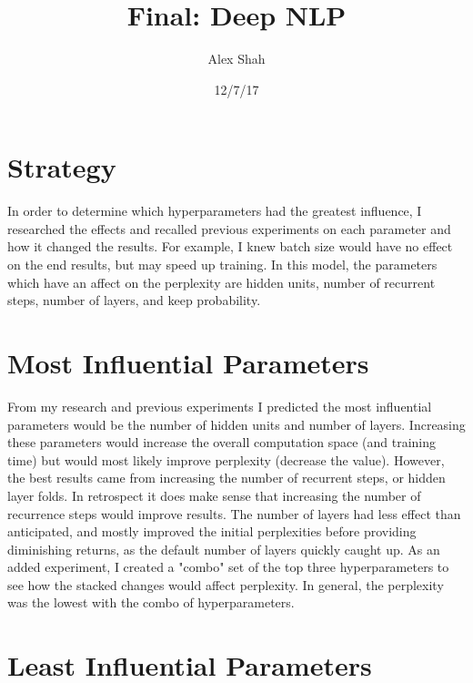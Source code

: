 \documentclass[10pt,a4paper]{article}
\begin{document}
\title{Final: Deep NLP}
\author{Alex Shah}
\date{12/7/17}

\maketitle

\section{Strategy}

In order to determine which hyperparameters had the greatest influence, I researched the effects and recalled previous experiments on each parameter and how it changed the results. For example, I knew batch size would have no effect on the end results, but may speed up training. In this model, the parameters which have an affect on the perplexity are hidden units, number of recurrent steps, number of layers, and keep probability.

\section{Most Influential Parameters}

From my research and previous experiments I predicted the most influential parameters would be the number of hidden units and number of layers. Increasing these parameters would increase the overall computation space (and training time) but would most likely improve perplexity (decrease the value). However, the best results came from increasing the number of recurrent steps, or hidden layer folds. In retrospect it does make sense that increasing the number of recurrence steps would improve results. The number of layers had less effect than anticipated, and mostly improved the initial perplexities before providing diminishing returns, as the default number of layers quickly caught up. As an added experiment, I created a "combo" set of the top three hyperparameters to see how the stacked changes would affect perplexity. In general, the perplexity was the lowest with the combo of hyperparameters.

\section{Least Influential Parameters}
\end{document}
